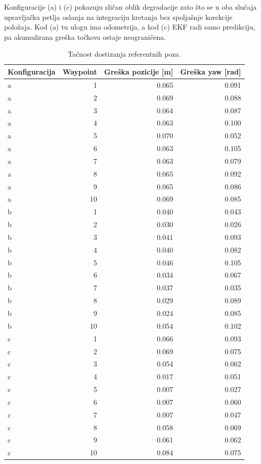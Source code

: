 Konfiguracije (a) i (c) pokazuju sličan oblik degradacije zato što se u oba slučaja upravljačka petlja oslanja na integraciju kretanja bez spoljašnje korekcije položaja. Kod (a) tu ulogu ima odometrija, a kod (c) EKF radi samo predikciju, pa akumulirana greška točkova ostaje neograničena.

\begin{table}[H]
\centering
\begin{tabular}{lrrr}
\hline
Konfiguracija & Waypoint & Greška pozicije [m] & Greška yaw [rad] \\
\hline
a & 1 & 0.065 & 0.091 \\
a & 2 & 0.069 & 0.088 \\
a & 3 & 0.064 & 0.087 \\
a & 4 & 0.063 & 0.100 \\
a & 5 & 0.070 & 0.052 \\
a & 6 & 0.063 & 0.105 \\
a & 7 & 0.063 & 0.079 \\
a & 8 & 0.065 & 0.092 \\
a & 9 & 0.065 & 0.086 \\
a & 10 & 0.069 & 0.085 \\
b & 1 & 0.040 & 0.043 \\
b & 2 & 0.030 & 0.026 \\
b & 3 & 0.041 & 0.093 \\
b & 4 & 0.040 & 0.082 \\
b & 5 & 0.046 & 0.105 \\
b & 6 & 0.034 & 0.067 \\
b & 7 & 0.037 & 0.035 \\
b & 8 & 0.029 & 0.089 \\
b & 9 & 0.024 & 0.085 \\
b & 10 & 0.054 & 0.102 \\
c & 1 & 0.066 & 0.093 \\
c & 2 & 0.069 & 0.075 \\
c & 3 & 0.054 & 0.062 \\
c & 4 & 0.017 & 0.051 \\
c & 5 & 0.007 & 0.027 \\
c & 6 & 0.007 & 0.060 \\
c & 7 & 0.007 & 0.047 \\
c & 8 & 0.058 & 0.069 \\
c & 9 & 0.061 & 0.062 \\
c & 10 & 0.084 & 0.075 \\
\hline
\end{tabular}
\caption{Tačnost dostizanja referentnih poza.}
\end{table}

